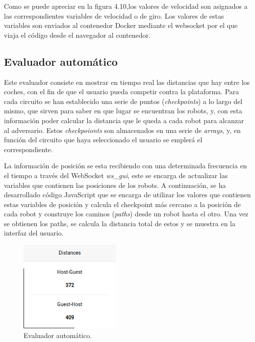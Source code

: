 \documentclass[a4paper, 12pt]{book}
\begin{document}
Como se puede apreciar en la figura 4.10,los valores de velocidad son asignados a las correspondientes variables de velocidad o de giro. Los valores de estas variables son enviados al contenedor Docker mediante el websocket por el que viaja el código desde el navegador al contenedor.

\subsection{Evaluador automático}
\label{follow_line_game_evaluator}

Este evaluador consiste en mostrar en tiempo real las distancias que hay entre los coches, con el fin de que el usuario pueda competir contra la plataforma. Para cada circuito se han establecido una serie de puntos (\emph{checkpoints}) a lo largo del mismo, que sirven para saber en que lugar se encuentran los robots, y, con esta información poder calcular la distancia que le queda a cada robot para alcanzar al adversario. Estos \emph{checkpoionts} son almacenados en una serie de \emph{arrays}, y, en función del circuito que haya seleccionado el usuario se emplerá el correspondiente.

La información de posición se esta recibiendo con una determinada frecuencia en el tiempo a través del WebSocket \emph{ws\_gui}, este se encarga de actualizar las variables que contienen las posiciones de los robots. A continuación, se ha desarrollado código JavaScript que se encarga de utilizar los valores que contienen estas variables de posición y calcula el checkpoint más cercano a la posición de cada robot y construye los caminos (\emph{paths}) desde un robot hasta el otro. Una vez se obtienen los paths, se calcula la distancia total de estos y se muestra en la interfaz del usuario.

\begin{figure}[H]
	\centering
    \includegraphics[width=5cm]{img/evaluator_follow_line.png}
    \caption{Evaluador automático.}
    \label{figura:keyhandler}
\end{figure}
\end{document}
